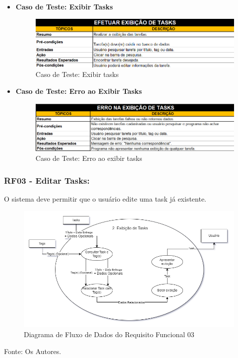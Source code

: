 \documentclass[a4paper,12pt]{article}
\begin{document}
\begin{itemize}
	\item\textbf{Caso de Teste: Exibir Tasks}
	\begin{figure}
		\centering
		\includegraphics[scale=0.75]{UnitTest/trueCase/showTask.png}
		\caption{Caso de Teste: Exibir tasks}
		\end{figure}
	\item\textbf{Caso de Teste: Erro ao Exibir Tasks}
	\begin{figure}
		\centering
		\includegraphics[scale=0.75]{UnitTest/falseCase/showTask.png}
		\caption{Caso de Teste: Erro ao exibir tasks}
	\end{figure}
\end{itemize}

\pagebreak
\subsubsection{RF03 - Editar Tasks:}
O sistema deve permitir que o usuário edite uma task já existente.
\begin{figure}[H]
	\centering
	\includegraphics[scale=0.45]{DFDs/RF02.drawio.png}
	\caption{Diagrama de Fluxo de Dados do Requisito Funcional 03}
\end{figure}
\noindent Fonte: Os Autores.
\end{document}
